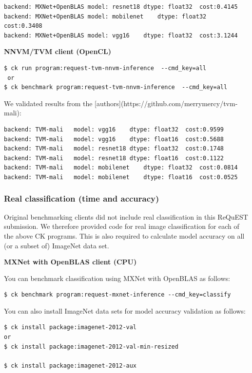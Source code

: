 \documentclass[sigplan]{acmart}
\begin{document}
\begin{verbatim}
backend: MXNet+OpenBLAS	model: resnet18	dtype: float32	cost:0.4145
backend: MXNet+OpenBLAS	model: mobilenet	dtype: float32	cost:0.3408
backend: MXNet+OpenBLAS	model: vgg16	dtype: float32	cost:3.1244
\end{verbatim}

\textbf{NNVM/TVM client (OpenCL)}

\begin{verbatim}
$ ck run program:request-tvm-nnvm-inference  --cmd_key=all 
 or
$ ck benchmark program:request-tvm-nnvm-inference  --cmd_key=all 

\end{verbatim}

We validated results from the [authors](https://github.com/merrymercy/tvm-mali):

\begin{verbatim}
backend: TVM-mali	model: vgg16	dtype: float32	cost:0.9599
backend: TVM-mali	model: vgg16	dtype: float16	cost:0.5688
backend: TVM-mali	model: resnet18	dtype: float32	cost:0.1748
backend: TVM-mali	model: resnet18	dtype: float16	cost:0.1122
backend: TVM-mali	model: mobilenet	dtype: float32	cost:0.0814
backend: TVM-mali	model: mobilenet	dtype: float16	cost:0.0525
\end{verbatim}

\subsubsection{Real classification (time and accuracy)}

Original benchmarking clients did not include real classification in this ReQuEST submission. 
We therefore provided code for real image classification for each of the above CK programs.
This is also required to calculate model accuracy on all (or a subset of) ImageNet data set.

\textbf{MXNet with OpenBLAS client (CPU)}

You can benchmark classification using MXNet with OpenBLAS as follows:

\begin{verbatim} 
$ ck benchmark program:request-mxnet-inference --cmd_key=classify
\end{verbatim}

You can also install ImageNet data sets for model accuracy validation as follows:

\begin{verbatim}
$ ck install package:imagenet-2012-val
or
$ ck install package:imagenet-2012-val-min-resized

$ ck install package:imagenet-2012-aux
\end{verbatim}
\end{document}
